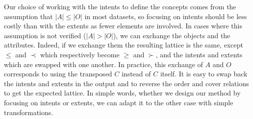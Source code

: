 Our choice of working with the intents to define the concepts comes from the assumption that $|A| \leq |O|$ in most datasets, so focusing on intents should be less costly than with the extents as fewer elements are involved.
In cases where this assumption is not verified ($|A| > |O|$), we can exchange the objects and the attributes.
Indeed, if we exchange them the resulting lattice is the same, except $\leq$ and $\prec$ which respectively become $\geq$ and $\succ$, and the intents and extents which are swapped with one another.
In practice, this exchange of $A$ and $O$ corresponds to using the transposed $C$ instead of $C$ itself.
It is easy to swap back the intents and extents in the output and to reverse the order and cover relations to get the expected lattice.
In simple words, whether we design our method by focusing on intents or extents, we can adapt it to the other case with simple transformations.

 